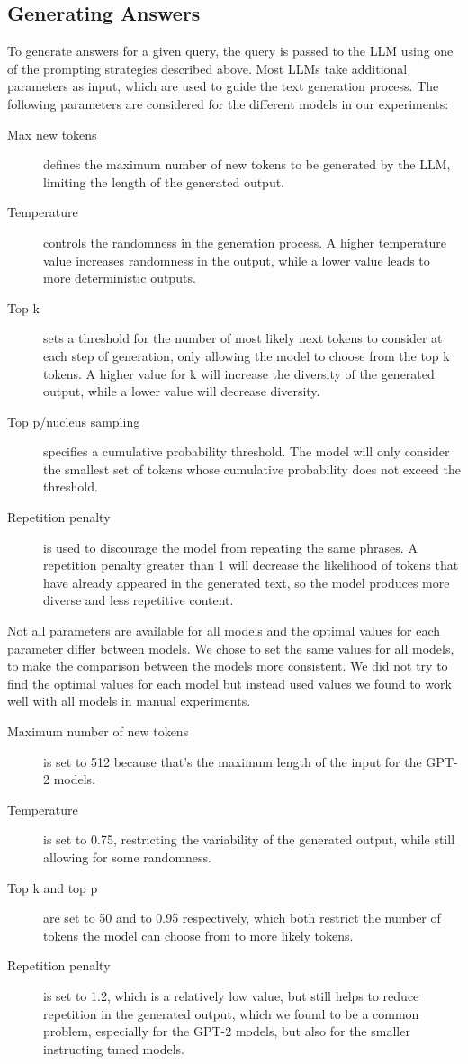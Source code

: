 \subsection{Generating Answers}
To generate answers for a given query, the query is passed to the LLM using one of the prompting strategies described above.
Most LLMs take additional parameters as input, which are used to guide the text generation process.
The following parameters are considered for the different models in our experiments:
\begin{description}
    \item [Max new tokens] defines the maximum number of new tokens to be generated by the LLM, limiting the length of the generated output.
    \item [Temperature] controls the randomness in the generation process. A higher temperature value increases randomness in the output, while a lower value leads to more deterministic outputs.
    \item [Top k] sets a threshold for the number of most likely next tokens to consider at each step of generation, only allowing the model to choose from the top k tokens. A higher value for k will increase the diversity of the generated output, while a lower value will decrease diversity.
    \item [Top p/nucleus sampling] specifies a cumulative probability threshold. The model will only consider the smallest set of tokens whose cumulative probability does not exceed the threshold.
    \item [Repetition penalty] is used to discourage the model from repeating the same phrases. A repetition penalty greater than 1 will decrease the likelihood of tokens that have already appeared in the generated text, so the model produces more diverse and less repetitive content.
\end{description}
Not all parameters are available for all models and the optimal values for each parameter differ between models.
We chose to set the same values for all models, to make the comparison between the models more consistent.
We did not try to find the optimal values for each model but instead used values we found to work well with all models in manual experiments.
\begin{description}
\item[Maximum number of new tokens] is set to 512 because that's the maximum length of the input for the GPT-2 models.

\item[Temperature] is set to 0.75, restricting the variability of the generated output, while still allowing for some randomness.

\item[Top k and top p] are set to 50 and to 0.95 respectively, which both restrict the number of tokens the model can choose from to more likely tokens.

\item[Repetition penalty] is set to 1.2, which is a relatively low value, but still helps to reduce repetition in the generated output, which we found to be a common problem, especially for the GPT-2 models, but also for the smaller instructing tuned models.
\end{description}
